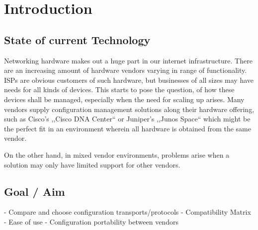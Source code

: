 \chapter{\label{introduction}Introduction}
\thispagestyle{fancy}


\section{\label{introduction-current}State of current Technology}

Networking hardware makes out a huge part in our internet infrastructure. 
There are an increasing amount of hardware vendors varying in range of functionality. 
\glspl{ISP} are obvious customers of such hardware, but businesses of all sizes may have needs for all kinds of devices. 
This starts to pose the question, of how these devices shall be managed, especially when the need for scaling up arises. 
Many vendors supply configuration management solutions along their hardware offering, 
such as Cisco's ,,Cisco DNA Center``\cite{noauthor_cisco_nodate} or Juniper's ,,Junos Space``\cite{noauthor_junos_nodate} 
which might be the perfect fit in an environment wherein all hardware is obtained from the same vendor.

On the other hand, in mixed vendor environments, problems arise when a solution may only have limited support for other vendors.


\section{\label{introduction-goal}Goal / Aim}


 - Compare and choose configuration transports/protocols
   - Compatibility Matrix
   - Ease of use
   - Configuration portability between vendors






